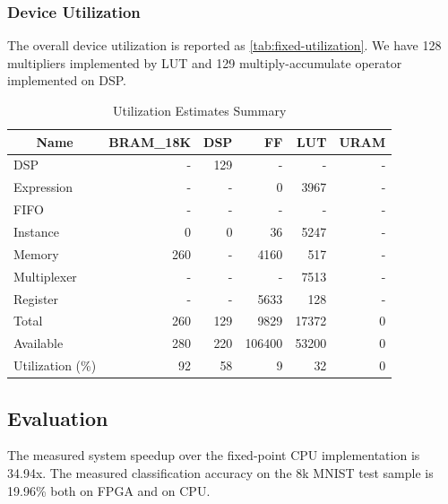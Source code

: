 \subsubsection{Device Utilization}

The overall device utilization is reported as \autoref{tab:fixed-utilization}.
We have 128 multipliers implemented by LUT and 129 multiply-accumulate operator implemented on DSP.

\begin{table}[ht!]
    \centering
    \caption{Utilization Estimates Summary}\label{tab:fixed-utilization}
    \begin{tabular}{lrrrrr}
        \toprule
        \multicolumn{1}{c}{Name} & BRAM\_18K & DSP & FF     & LUT   & URAM \\
        \midrule
        DSP                      & -         & 129 & -      & -     & -    \\
        Expression               & -         & -   & 0      & 3967  & -    \\
        FIFO                     & -         & -   & -      & -     & -    \\
        Instance                 & 0         & 0   & 36     & 5247  & -    \\
        Memory                   & 260       & -   & 4160   & 517   & -    \\
        Multiplexer              & -         & -   & -      & 7513  & -    \\
        Register                 & -         & -   & 5633   & 128   & -    \\
        \midrule
        Total                    & 260       & 129 & 9829   & 17372 & 0    \\
        \midrule
        Available                & 280       & 220 & 106400 & 53200 & 0    \\
        \midrule
        Utilization (\%)         & 92        & 58  & 9      & 32    & 0    \\
        \bottomrule
    \end{tabular}
\end{table}

\subsection{Evaluation}

The measured system speedup over the fixed-point CPU implementation is 34.94x.
The measured classification accuracy on the 8k MNIST test sample is 19.96\% both on FPGA and on CPU.

